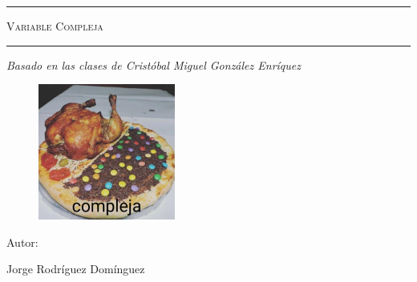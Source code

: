 \begin{titlepage}
    \centering
    {\bfseries\LARGE \ \par}
    \vspace{1cm}
    {\scshape\Large \ \par}
    \vspace{3cm}
    \rule{\linewidth}{0.5mm}
    {\scshape\Huge Variable Compleja \par}
    \rule{\linewidth}{0.5mm} \par
    \vspace{3cm}
    {\itshape\Large Basado en las clases de Cristóbal Miguel González Enríquez \par}
    \vfill
    \begin{figure}[H]
        \centering
        \includegraphics[width=0.4\textwidth]{complejaxd.jpeg}
    \end{figure}
    {\Large Autor: \par}
    {\Large Jorge Rodríguez Domínguez \par}
    \vfill
\end{titlepage}
\tableofcontents